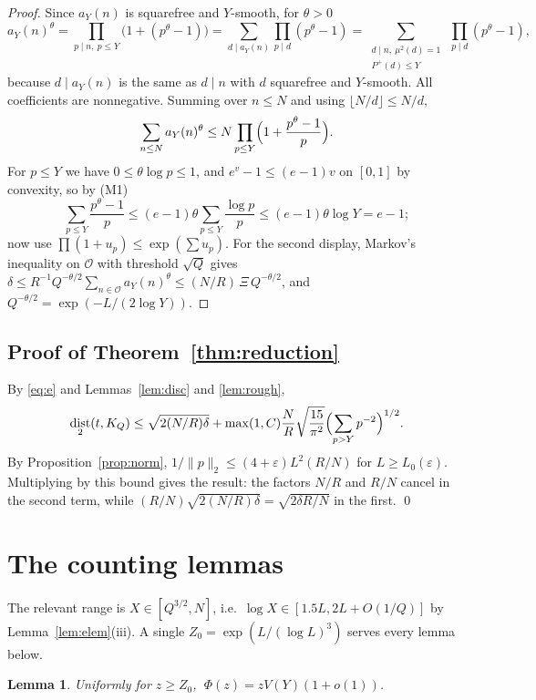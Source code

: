 \documentclass[11pt,a4paper]{article}
\theoremstyle{plain}
\newtheorem{lemma}[theorem]{Lemma}
\theoremstyle{definition}
\theoremstyle{remark}
\DeclareMathOperator{\dist}{dist}
\newcommand{\Pp}{P^{+}}
\newcommand{\vR}{\mathcal{O}}
\newcommand{\eps}{\varepsilon}
\begin{document}
\begin{proof}
Since $a_{Y}(n)$ is squarefree and $Y$-smooth, for $\theta>0$
\[
  a_{Y}(n)^{\theta}=\!\!\prod_{p\mid n,\ p\le Y}\!\!\bigl(1+(p^{\theta}-1)\bigr)
  =\sum_{d\mid a_{Y}(n)}\prod_{p\mid d}(p^{\theta}-1)
  =\sum_{\substack{d\mid n,\ \mu^{2}(d)=1\\ \Pp(d)\le Y}}\ \prod_{p\mid d}(p^{\theta}-1),
\]
because $d\mid a_{Y}(n)$ is the same as $d\mid n$ with $d$ squarefree and $Y$-smooth. All coefficients are
nonnegative. Summing over $n\le N$ and using $\lfloor N/d\rfloor\le N/d$,
\[
  \sum_{n\le N}a_{Y}(n)^{\theta}\le N\prod_{p\le Y}\Bigl(1+\frac{p^{\theta}-1}p\Bigr).
\]
For $p\le Y$ we have $0\le\theta\log p\le1$, and $e^{v}-1\le(e-1)v$ on $[0,1]$ by convexity, so by (M1)
\[
  \sum_{p\le Y}\frac{p^{\theta}-1}p\le(e-1)\theta\sum_{p\le Y}\frac{\log p}p
  \le(e-1)\theta\log Y=e-1;
\]
now use $\prod(1+u_{p})\le\exp(\sum u_{p})$. For the second display, Markov's inequality on $\vR$ with
threshold $\sqrt Q$ gives
$\delta\le R^{-1}Q^{-\theta/2}\sum_{n\in\vR}a_{Y}(n)^{\theta}\le(N/R)\,\Xi\,Q^{-\theta/2}$, and
$Q^{-\theta/2}=\exp(-L/(2\log Y))$.
\end{proof}

\subsection{Proof of Theorem~\ref{thm:reduction}}\label{sec:redproof}
By \eqref{eq:e} and Lemmas~\ref{lem:disc} and \ref{lem:rough},
\[
  \dist_{2}(t,K_{Q})\le\sqrt{2(N/R)\delta}+\max(1,C)\frac NR\sqrt{\frac{15}{\pi^{2}}}
  \Bigl(\sum_{p>Y}p^{-2}\Bigr)^{1/2}.
\]
By Proposition~\ref{prop:norm}, $1/\|p\|_{2}\le(4+\eps)L^{2}(R/N)$ for $L\ge L_{0}(\eps)$.
Multiplying by this bound gives the result: the factors $N/R$ and $R/N$ cancel in the second term,
while $(R/N)\sqrt{2(N/R)\delta}=\sqrt{2\delta R/N}$ in the first. \qed

\section{The counting lemmas}\label{sec:counting}

The relevant range is $X\in[Q^{3/2},N]$, i.e.\ $\log X\in[1.5L,2L+O(1/Q)]$ by
Lemma~\ref{lem:elem}(iii). A single $Z_{0}=\exp(L/(\log L)^{3})$ serves every lemma below.

\begin{lemma}\label{lem:phi}
Uniformly for $z\ge Z_{0}$, $\ \Phi(z)=zV(Y)(1+o(1))$.
\end{lemma}
\end{document}
